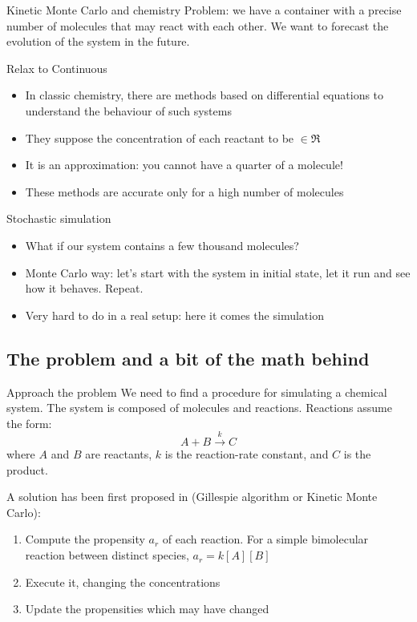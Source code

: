 \documentclass[presentation]{beamer}
\begin{document}
\begin{frame}{Kinetic Monte Carlo and chemistry}
Problem: we have a container with a precise number of molecules that may react with each other.
We want to forecast the evolution of the system in the future.
 \begin{block}{Relax to Continuous}
  \begin{itemize}
        \item In classic chemistry, there are methods based on differential equations to understand the behaviour of such systems
        \item They suppose the concentration of each reactant to be $\in \Re$
        \item It is an approximation: you cannot have a quarter of a molecule!
        \item These methods are accurate only for a high number of molecules
  \end{itemize}
 \end{block}
 \begin{block}{Stochastic simulation}
  \begin{itemize}
        \item What if our system contains a few thousand molecules?
        \item Monte Carlo way: let's start with the system in initial state, let it run and see how it behaves. Repeat.
        \item Very hard to do in a real setup: here it comes the simulation
  \end{itemize}
 \end{block}
\end{frame}

\subsection{The problem and a bit of the math behind}
\begin{frame}{Approach the problem}
We need to find a procedure for simulating a chemical system. The system is composed of molecules and reactions. Reactions assume the form:
$$A + B\xrightarrow{k} C$$
where $A$ and $B$ are reactants, $k$ is the reaction-rate constant, and $C$ is the product.

A solution has been first proposed in \cite{GillespieJPC1977} (Gillespie algorithm or Kinetic Monte Carlo):
 \begin{enumerate}
   \item Compute the propensity $a_r$ of each reaction.
   For a simple bimolecular reaction between distinct species, $a_r = k[A][B]$
   \item Execute it, changing the concentrations
   \item Update the propensities which may have changed
  \end{enumerate}
\end{frame}
\end{document}
